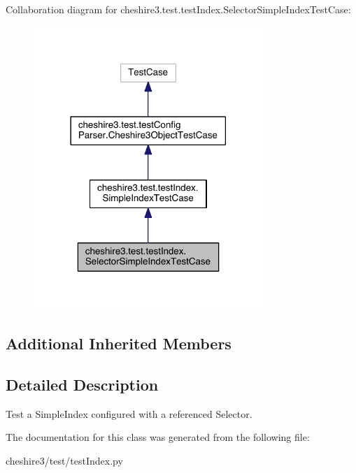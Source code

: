 Collaboration diagram for cheshire3.\-test.\-test\-Index.\-Selector\-Simple\-Index\-Test\-Case\-:
\nopagebreak
\begin{figure}[H]
\begin{center}
\leavevmode
\includegraphics[width=246pt]{classcheshire3_1_1test_1_1test_index_1_1_selector_simple_index_test_case__coll__graph}
\end{center}
\end{figure}
\subsection*{Additional Inherited Members}


\subsection{Detailed Description}
\begin{DoxyVerb}Test a SimpleIndex configured with a referenced Selector.\end{DoxyVerb}
 

The documentation for this class was generated from the following file\-:\begin{DoxyCompactItemize}
\item 
cheshire3/test/test\-Index.\-py\end{DoxyCompactItemize}
